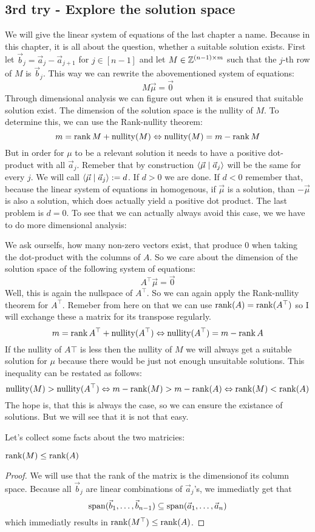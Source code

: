 \subsection{3rd try - Explore the solution space}
We will give the linear system of equations of the last chapter a name. Because in this chapter, it is all about the question, whether a suitable solution exists. First let $\vec b_j = \vec a_j - \vec a_{j+1}$ for $j \in [n-1]$ and let $M \in \mathbb{Z}^{(n-1) \times m}$ such that the $j$-th row of $M$ is $\vec b_j$. This way we can rewrite the abovementioned system of equations:
$$M\vec\mu = \vec0$$
Through dimensional analysis we can figure out when it is ensured that suitable solution exist. The dimension of the solution space is the nullity of $M$. To determine this, we can use the Rank-nullity theorem:
$$m = \operatorname{rank}{M} + \operatorname{nullity}(M) \Leftrightarrow \operatorname{nullity}(M) = m - \operatorname{rank}{M}$$
But in order for $\mu$ to be a relevant solution it needs to have a positive dot-product with all $\vec a_j$. Remeber that by construction $\langle \vec\mu \mid \vec a_j \rangle$ will be the same for every $j$. We will call $\langle \vec\mu \mid \vec a_j \rangle := d$. If $d > 0$ we are done. If $d < 0$ remember that, because the linear system of equations in homogenous, if $\vec\mu$ is a solution, than $-\vec\mu$ is also a solution, which does actually yield a positive dot product. The last problem is $d = 0$. To see that we can actually always avoid this case, we we have to do more dimensional analysis:

We ask ourselfs, how many non-zero vectors exist, that produce 0 when taking the dot-product with the columns of $A$. So we care about the dimension of the solution space of the following system of equations:
$$A^\top\vec\mu = \vec0$$
Well, this is again the nullspace of $A^\top$. So we can again apply the Rank-nullity theorem for $A^\top$. Remeber from here on that we can use $\operatorname{rank}(A) = \operatorname{rank}(A^\top)$ so I will exchange these a matrix for its transpose regularly.
$$m = \operatorname{rank}{A^\top} + \operatorname{nullity}(A^\top) \Leftrightarrow \operatorname{nullity}(A^\top) = m - \operatorname{rank}{A}$$
If the nullity of $A\top$ is less then the nullity of $M$ we will always get a suitable solution for $\mu$ because there would be just not enough unsuitable solutions. This inequality can be restated as follows:
$$\operatorname{nullity}(M) > \operatorname{nullity}(A^\top) \Leftrightarrow m - \operatorname{rank}(M) > m - \operatorname{rank}(A) \Leftrightarrow \operatorname{rank}(M) < \operatorname{rank}(A)$$
The hope is, that this is always the case, so we can ensure the existance of solutions. But we will see that it is not that easy.

Let's collect some facts about the two matricies:
\begin{lemma}
    $\operatorname{rank}(M) \leq \operatorname{rank}(A)$
\end{lemma}
\begin{proof}
    We will use that the rank of the matrix is the dimensionof its column space. Because all $\vec b_j$ are linear combinations of $\vec a_j$'s, we immediatly get that
    $$\operatorname{span}(\vec b_1, \dots, \vec b_{n-1}) \subseteq \operatorname{span}(\vec a_1, \dots, \vec a_n)$$
    which immediatly results in $\operatorname{rank}(M^\top) \leq \operatorname{rank}(A)$.
\end{proof}


